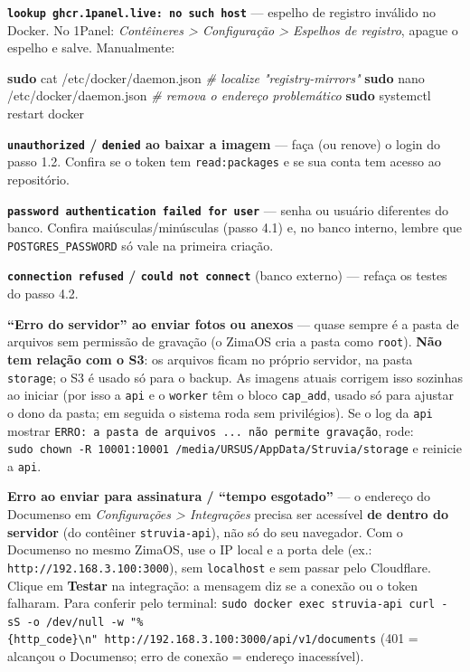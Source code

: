 \documentclass[
  10pt,
]{article}
\newenvironment{Shaded}{\begin{snugshade}}{\end{snugshade}}
\newcommand{\CommentTok}[1]{\textcolor[rgb]{0.56,0.35,0.01}{\textit{#1}}}
\newcommand{\FunctionTok}[1]{\textcolor[rgb]{0.13,0.29,0.53}{\textbf{#1}}}
\newcommand{\NormalTok}[1]{#1}
\begin{document}
\textbf{\texttt{lookup\ ghcr.1panel.live:\ no\ such\ host}} --- espelho
de registro inválido no Docker. No 1Panel: \emph{Contêineres
\textgreater{} Configuração \textgreater{} Espelhos de registro}, apague
o espelho e salve. Manualmente:

\begin{Shaded}
\begin{Highlighting}[]
\FunctionTok{sudo}\NormalTok{ cat /etc/docker/daemon.json          }\CommentTok{\# localize "registry{-}mirrors"}
\FunctionTok{sudo}\NormalTok{ nano /etc/docker/daemon.json         }\CommentTok{\# remova o endereço problemático}
\FunctionTok{sudo}\NormalTok{ systemctl restart docker}
\end{Highlighting}
\end{Shaded}

\textbf{\texttt{unauthorized} / \texttt{denied} ao baixar a imagem} ---
faça (ou renove) o login do passo 1.2. Confira se o token tem
\texttt{read:packages} e se sua conta tem acesso ao repositório.

\textbf{\texttt{password\ authentication\ failed\ for\ user}} --- senha
ou usuário diferentes do banco. Confira maiúsculas/minúsculas (passo
4.1) e, no banco interno, lembre que \texttt{POSTGRES\_PASSWORD} só vale
na primeira criação.

\textbf{\texttt{connection\ refused} / \texttt{could\ not\ connect}}
(banco externo) --- refaça os testes do passo 4.2.

\textbf{``Erro do servidor'' ao enviar fotos ou anexos} --- quase sempre
é a pasta de arquivos sem permissão de gravação (o ZimaOS cria a pasta
como \texttt{root}). \textbf{Não tem relação com o S3}: os arquivos
ficam no próprio servidor, na pasta \texttt{storage}; o S3 é usado só
para o backup. As imagens atuais corrigem isso sozinhas ao iniciar (por
isso a \texttt{api} e o \texttt{worker} têm o bloco \texttt{cap\_add},
usado só para ajustar o dono da pasta; em seguida o sistema roda sem
privilégios). Se o log da \texttt{api} mostrar
\texttt{ERRO:\ a\ pasta\ de\ arquivos\ ...\ não\ permite\ gravação},
rode:
\texttt{sudo\ chown\ -R\ 10001:10001\ /media/URSUS/AppData/Struvia/storage}
e reinicie a \texttt{api}.

\textbf{Erro ao enviar para assinatura / ``tempo esgotado''} --- o
endereço do Documenso em \emph{Configurações \textgreater{} Integrações}
precisa ser acessível \textbf{de dentro do servidor} (do contêiner
\texttt{struvia-api}), não só do seu navegador. Com o Documenso no mesmo
ZimaOS, use o IP local e a porta dele (ex.:
\texttt{http://192.168.3.100:3000}), sem \texttt{localhost} e sem passar
pelo Cloudflare. Clique em \textbf{Testar} na integração: a mensagem diz
se a conexão ou o token falharam. Para conferir pelo terminal:
\texttt{sudo\ docker\ exec\ struvia-api\ curl\ -sS\ -o\ /dev/null\ -w\ "\%\{http\_code\}\textbackslash{}n"\ http://192.168.3.100:3000/api/v1/documents}
(401 = alcançou o Documenso; erro de conexão = endereço inacessível).
\end{document}

